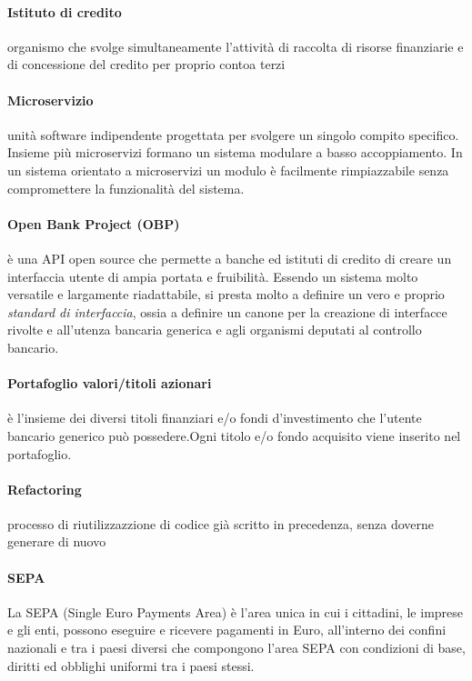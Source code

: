 \paragraph{Istituto di credito}
	organismo che svolge simultaneamente l’attività di raccolta di risorse finanziarie e di concessione del credito per proprio contoa terzi 
\paragraph{Microservizio}
unit\`a software indipendente progettata per svolgere un singolo compito specifico. Insieme pi\`u microservizi formano un sistema modulare a basso accoppiamento. In un sistema orientato a microservizi un modulo \`e facilmente rimpiazzabile senza compromettere la funzionalit\`a del sistema.

\paragraph{Open Bank Project (OBP)}
	è una API open source che permette a banche ed istituti di credito di creare un interfaccia utente di ampia portata e fruibilità. Essendo un sistema molto versatile e largamente riadattabile, si presta molto a definire un vero e proprio \emph{standard di interfaccia}, ossia a definire un canone per la creazione di interfacce rivolte e all'utenza bancaria generica e agli organismi deputati al controllo bancario. \cite{obp}
\paragraph{Portafoglio valori/titoli azionari}
	è l'insieme dei diversi titoli finanziari e/o fondi d'investimento che l'utente bancario generico può possedere.Ogni titolo e/o fondo acquisito viene inserito nel portafoglio.
\paragraph{Refactoring}
	processo di riutilizzazzione di codice già scritto in precedenza, senza doverne generare di nuovo
\paragraph{SEPA}
	La SEPA (Single Euro Payments Area) è l’area unica in cui i cittadini, le imprese e gli enti, possono eseguire e ricevere pagamenti in Euro, all’interno dei confini nazionali e tra i paesi diversi che compongono l’area SEPA con condizioni di base, diritti ed obblighi uniformi tra i paesi stessi. 
